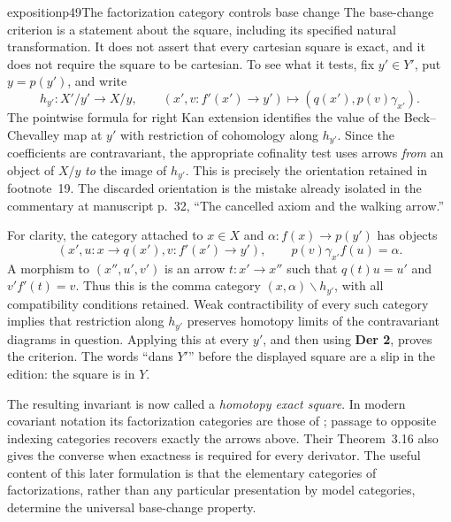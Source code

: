 \begin{dcomment}{exposition}{p49}{The factorization category controls base change}
The base-change criterion is a statement about the square, including its specified natural transformation. It does not assert that every cartesian square is exact, and it does not require the square to be cartesian. To see what it tests, fix $y'\in Y'$, put $y=p(y')$, and write
\[
 h_{y'}:X'/y'\longrightarrow X/y,
 \qquad (x',v:f'(x')\to y')\longmapsto
 (q(x'),p(v)\gamma_{x'}).
\]
The pointwise formula for right Kan extension identifies the value of the Beck--Chevalley map at $y'$ with restriction of cohomology along $h_{y'}$. Since the coefficients are contravariant, the appropriate cofinality test uses arrows \emph{from} an object of $X/y$ \emph{to} the image of $h_{y'}$. This is precisely the orientation retained in footnote~19. The discarded orientation is the mistake already isolated in the commentary at manuscript p.~32, ``The cancelled axiom and the walking arrow.''

For clarity, the category attached to $x\in X$ and $\alpha:f(x)\to p(y')$ has objects
\[
 (x',u:x\to q(x'),v:f'(x')\to y'),
 \qquad p(v)\gamma_{x'}f(u)=\alpha.
\]
A morphism to $(x'',u',v')$ is an arrow $t:x'\to x''$ such that $q(t)u=u'$ and $v'f'(t)=v$. Thus this is the comma category $(x,\alpha)\backslash h_{y'}$, with all compatibility conditions retained. Weak contractibility of every such category implies that restriction along $h_{y'}$ preserves homotopy limits of the contravariant diagrams in question. Applying this at every $y'$, and then using \textbf{Der 2}, proves the criterion. The words ``dans $Y'$'' before the displayed square are a slip in the edition: the square is in $Y$.

The resulting invariant is now called a \emph{homotopy exact square}. In modern covariant notation its factorization categories are those of \citet[Definition~3.7 and Theorem~3.8]{GrothPontoShulman2014}; passage to opposite indexing categories recovers exactly the arrows above. Their Theorem~3.16 also gives the converse when exactness is required for every derivator. The useful content of this later formulation is that the elementary categories of factorizations, rather than any particular presentation by model categories, determine the universal base-change property.
\end{dcomment}

